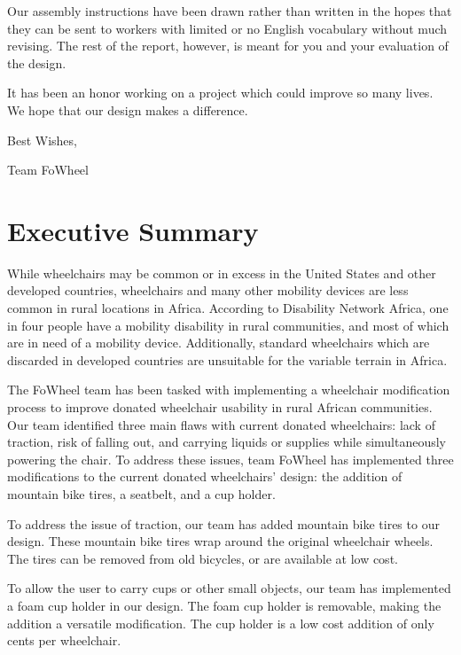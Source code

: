 \documentclass[12pt]{report}
\begin{document}
Our assembly instructions have been drawn rather than written in the hopes that
they can be sent to workers with limited or no English vocabulary without much
revising. The rest of the report, however, is meant for you and your evaluation
of the design.

It has been an honor working on a project which could improve so many lives. We
hope that our design makes a difference.

Best Wishes,

Team FoWheel

\clearpage
\maketitle

\chapter{Executive Summary}

While wheelchairs may be common or in excess in the United States
and other developed countries, wheelchairs and many other mobility devices are
less common in rural locations in Africa. According to Disability Network
Africa, one in four people have a mobility disability in rural communities, and
most of which are in need of a mobility device\cite{dna-disabled}. Additionally, standard
wheelchairs which are discarded in developed countries are unsuitable for the
variable terrain in Africa.

The FoWheel team has been tasked with implementing a wheelchair modification
process to improve donated wheelchair usability in rural African communities.
Our team identified three main flaws with current donated wheelchairs:
lack of traction, risk of falling out, and carrying liquids or supplies while simultaneously
powering the chair. To address these issues, team FoWheel has
implemented three modifications to the current donated wheelchairs' design: the
addition of mountain bike tires, a seatbelt, and a cup holder.

To address the issue of traction, our team has added mountain bike tires
to our design. These mountain bike tires wrap around the original wheelchair
wheels. The tires can be removed from old bicycles, or are available at low
cost.

To allow the user to carry cups or other small objects, our team has implemented a foam cup
holder in our design. The foam cup holder is removable, making the addition a
versatile modification. The cup holder is a low cost addition of only cents per
wheelchair.
\end{document}
